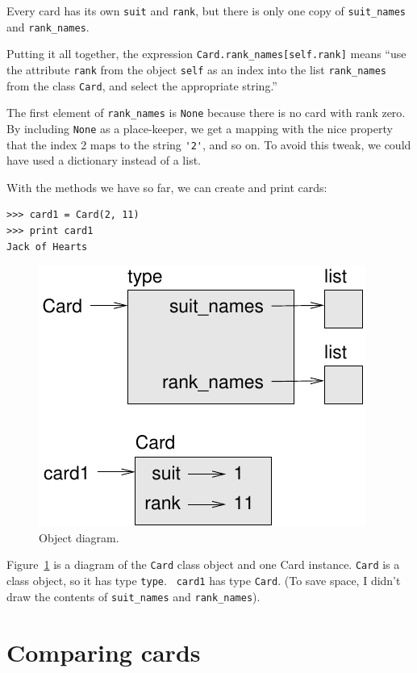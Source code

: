 \documentclass[10pt]{book}
\begin{document}
\begin{CJK}{UTF8}{gbsn}
Every card has its own {\tt suit} and {\tt rank}, but there
is only one copy of \verb"suit_names" and \verb"rank_names".

Putting it all together, the expression
\verb"Card.rank_names[self.rank]" means ``use the attribute {\tt rank}
from the object {\tt self} as an index into the list \verb"rank_names"
from the class {\tt Card}, and select the appropriate string.''

The first element of \verb"rank_names" is {\tt None} because there
is no card with rank zero.  By including {\tt None} as a place-keeper,
we get a mapping with the nice property that the index 2 maps to the
string \verb"'2'", and so on.  To avoid this tweak, we could have
used a dictionary instead of a list.

With the methods we have so far, we can create and print cards:

\begin{verbatim}
>>> card1 = Card(2, 11)
>>> print card1
Jack of Hearts
\end{verbatim}

\begin{figure}
\centerline
{\includegraphics[scale=0.8]{figs/card1.pdf}}
\caption{Object diagram.}
\label{fig.card1}
\end{figure}

Figure~\ref{fig.card1} is a diagram of the {\tt Card} class object
and one Card instance.
{\tt Card} is a class object, so it has type {\tt type}.  {\tt
card1} has type {\tt Card}.  (To save space, I didn't draw the
contents of \verb"suit_names" and \verb"rank_names").


\section{Comparing cards}
\label{comparecard}


\end{CJK}
\end{document}
